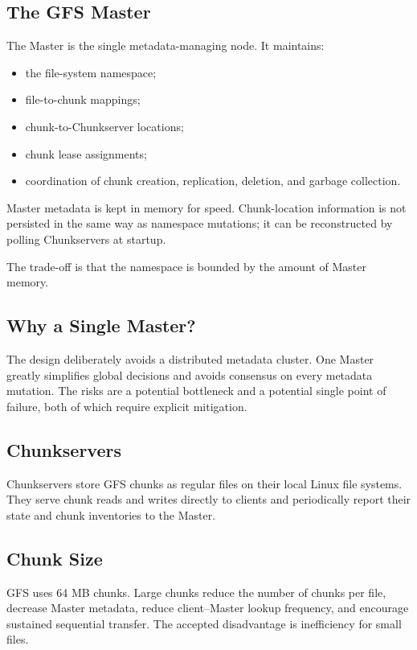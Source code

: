 \documentclass[11pt,a4paper,oneside]{book}
\begin{document}
\subsection{The GFS Master}

The Master is the single metadata-managing node. It maintains:

\begin{itemize}
    \item the file-system namespace;
    \item file-to-chunk mappings;
    \item chunk-to-Chunkserver locations;
    \item chunk lease assignments;
    \item coordination of chunk creation, replication, deletion, and garbage collection.
\end{itemize}

Master metadata is kept in memory for speed. Chunk-location information is not persisted in the same way as namespace mutations; it can be reconstructed by polling Chunkservers at startup.

The trade-off is that the namespace is bounded by the amount of Master memory.

\subsection{Why a Single Master?}

The design deliberately avoids a distributed metadata cluster. One Master greatly simplifies global decisions and avoids consensus on every metadata mutation. The risks are a potential bottleneck and a potential single point of failure, both of which require explicit mitigation.

\subsection{Chunkservers}

Chunkservers store GFS chunks as regular files on their local Linux file systems. They serve chunk reads and writes directly to clients and periodically report their state and chunk inventories to the Master.

\subsection{Chunk Size}

GFS uses 64 MB chunks. Large chunks reduce the number of chunks per file, decrease Master metadata, reduce client--Master lookup frequency, and encourage sustained sequential transfer. The accepted disadvantage is inefficiency for small files.
\end{document}
